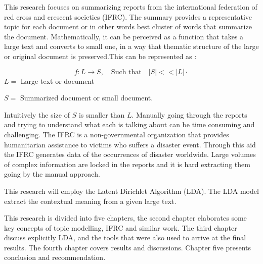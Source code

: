 This research focuses on summarizing reports from the international federation of red cross and crescent societies (IFRC). The summary provides  a  representative topic for each document or in other words best cluster of words that summarize the document. Mathematically, it can be perceived as a function that takes a large text and converts to small one, in a way that thematic structure of the large or original document is preserved.This can be represented as :

$$f:L \longrightarrow S, \quad \text{Such that} \quad |S|<< |L| \cdot$$
$L=$ Large text or document

 $S=$ Summarized document or small document.
  
Intuitively the size of $S$ is smaller than $L$.
Manually going through the reports and trying to understand what each is talking about can be time consuming and challenging. The IFRC is a non-governmental organization
that provides humanitarian assistance to victims who suffers a disaster event. Through this aid the 	IFRC generates data of the occurrences of disaster worldwide. Large volumes of complex information    are locked in the reports and it is hard extracting them going by the manual approach. 

This research will employ the Latent Dirichlet Algorithm (LDA).
 The LDA model extract the contextual meaning from a given large text. 

This research is divided into five chapters, the second chapter elaborates some key concepts of topic modelling, IFRC and similar work. The third chapter discuss explicitly LDA,  and the tools that were also used to arrive at the final results. The fourth chapter covers results and discussions. Chapter five presents conclusion and recommendation.

  
